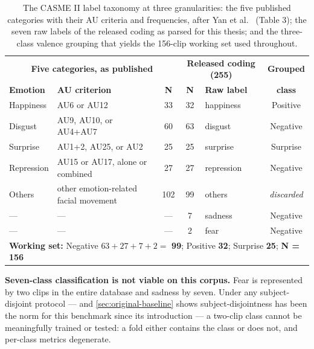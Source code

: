 \begin{table}[htbp]
	\centering
	\footnotesize
	\begin{tabular}{l l c c l c}
		\hline
		\multicolumn{3}{c}{\textbf{Five categories, as published}} & \multicolumn{2}{c}{\textbf{Released coding (255)}} & \textbf{Grouped} \\
		\textbf{Emotion} & \textbf{AU criterion} & \textbf{N} & \textbf{N} & \textbf{Raw label} & \textbf{class} \\
		\hline
		Happiness  & AU6 or AU12                           & 33  & 32 & happiness  & Positive \\
		Disgust    & AU9, AU10, or AU4+AU7                 & 60  & 63 & disgust    & Negative \\
		Surprise   & AU1+2, AU25, or AU2                   & 25  & 25 & surprise   & Surprise \\
		Repression & AU15 or AU17, alone or combined       & 27  & 27 & repression & Negative \\
		Others     & other emotion-related facial movement & 102 & 99 & others     & \textit{discarded} \\
		---        & ---                                   & --- & 7  & sadness    & Negative \\
		---        & ---                                   & --- & 2  & fear       & Negative \\
		\hline
		\multicolumn{6}{l}{\textbf{Working set:} Negative $63+27+7+2 = $ \textbf{99}; Positive \textbf{32}; Surprise \textbf{25}; \textbf{N = 156}} \\
		\hline
	\end{tabular}
	\caption[CASME II label taxonomy and the three-class working set]{The CASME II label taxonomy at three granularities: the five published categories with their AU criteria and frequencies, after Yan et al.~\cite{yan2014} (Table 3); the seven raw labels of the released coding as parsed for this thesis; and the three-class valence grouping that yields the 156-clip working set used throughout.}
	\label{tab:casme2-labels}
\end{table}

\textbf{Seven-class classification is not viable on this corpus.} Fear is represented by two clips in the entire database and sadness by seven. Under any subject-disjoint protocol --- and \autoref{sec:original-baseline} shows subject-disjointness has been the norm for this benchmark since its introduction --- a two-clip class cannot be meaningfully trained or tested: a fold either contains the class or does not, and per-class metrics degenerate.

